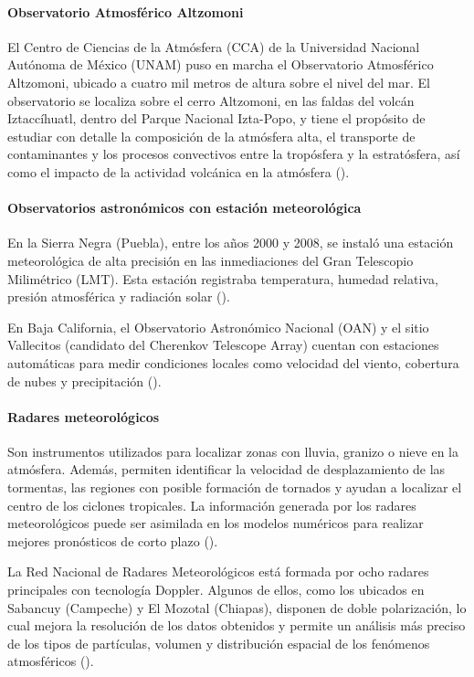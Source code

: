 \paragraph{Observatorio Atmosférico Altzomoni}

El Centro de Ciencias de la Atmósfera (CCA) de la Universidad Nacional Autónoma de México (UNAM) puso en marcha el Observatorio Atmosférico Altzomoni, ubicado a cuatro mil metros de altura sobre el nivel del mar. El observatorio se localiza sobre el cerro Altzomoni, en las faldas del volcán Iztaccíhuatl, dentro del Parque Nacional Izta-Popo, y tiene el propósito de estudiar con detalle la composición de la atmósfera alta, el transporte de contaminantes y los procesos convectivos entre la tropósfera y la estratósfera, así como el impacto de la actividad volcánica en la atmósfera  (\cite{sedema2025}).

\paragraph{Observatorios astronómicos con estación meteorológica}

En la Sierra Negra (Puebla), entre los años 2000 y 2008, se instaló una estación meteorológica de alta precisión en las inmediaciones del Gran Telescopio Milimétrico (LMT). Esta estación registraba temperatura, humedad relativa, presión atmosférica y radiación solar  (\cite{granicus2009}).

En Baja California, el Observatorio Astronómico Nacional (OAN) y el sitio Vallecitos (candidato del Cherenkov Telescope Array) cuentan con estaciones automáticas para medir condiciones locales como velocidad del viento, cobertura de nubes y precipitación (\cite{garcia2020, vallecitos2016}).

\paragraph{Radares meteorológicos}
Son instrumentos utilizados para localizar zonas con lluvia, granizo o nieve en la atmósfera. Además, permiten identificar la velocidad de desplazamiento de las tormentas, las regiones con posible formación de tornados y ayudan a localizar el centro de los ciclones tropicales. La información generada por los radares meteorológicos puede ser asimilada en los modelos numéricos para realizar mejores pronósticos de corto plazo (\cite{smn2025}).

La Red Nacional de Radares Meteorológicos está formada por ocho radares principales con tecnología Doppler. Algunos de ellos, como los ubicados en Sabancuy (Campeche) y El Mozotal (Chiapas), disponen de doble polarización, lo cual mejora la resolución de los datos obtenidos y permite un análisis más preciso de los tipos de partículas, volumen y distribución espacial de los fenómenos atmosféricos (\cite{smn_radar65_2025}).

